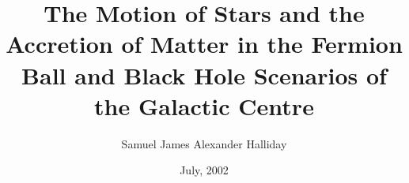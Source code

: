 \documentclass[11pt, a4paper, titlepage]{article}
\begin{document}
%
\title{The Motion of Stars and the Accretion of Matter in the Fermion Ball and Black Hole Scenarios of the Galactic Centre}
\author{Samuel James Alexander Halliday}
\date{July, 2002}
\maketitle
%

\tableofcontents
\clearpage
{}






%


\appendix





\end{document}
